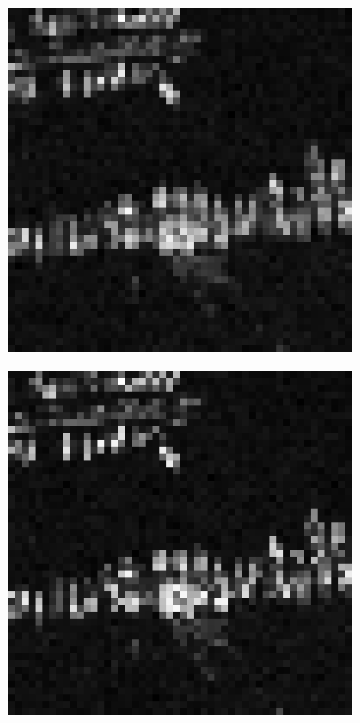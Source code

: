 \begin{figure}[t]
\begin{subfigure}{0.2\textwidth}
\end{subfigure}%
\begin{subfigure}{0.2\textwidth}
\includegraphics[width=\textwidth]{img/aliasedImg2L4}
\end{subfigure}%
\begin{subfigure}{0.2\textwidth}
\includegraphics[width=\textwidth]{img/aliasedImg2L5}

\end{subfigure}
\end{figure}
